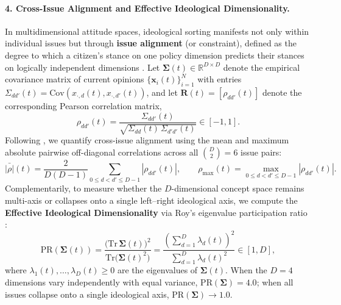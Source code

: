 \documentclass{article}
\begin{document}
\paragraph{4. Cross-Issue Alignment and Effective Ideological Dimensionality.}
In multidimensional attitude spaces, ideological sorting manifests not only within individual issues but through \textbf{issue alignment} (or constraint), defined as the degree to which a citizen's stance on one policy dimension predicts their stances on logically independent dimensions \citep{converse1964nature, baldassarri2008partisans}. Let $\boldsymbol{\Sigma}(t) \in \mathbb{R}^{D \times D}$ denote the empirical covariance matrix of current opinions $\{\mathbf{x}_i(t)\}_{i=1}^N$ with entries $\Sigma_{dd'}(t) = \mathrm{Cov}(x_{\cdot, d}(t), x_{\cdot, d'}(t))$, and let $\mathbf{R}(t) = [\rho_{dd'}(t)]$ denote the corresponding Pearson correlation matrix,
\begin{equation}
    \rho_{dd'}(t) = \frac{\Sigma_{dd'}(t)}{\sqrt{\Sigma_{dd}(t)\,\Sigma_{d'd'}(t)}} \in [-1, 1].
    \label{eq:pearson_issue_corr}
\end{equation}
Following \citet{baldassarri2008partisans}, we quantify cross-issue alignment using the mean and maximum absolute pairwise off-diagonal correlations across all $\binom{D}{2} = 6$ issue pairs:
\begin{equation}
    \bar{|\rho|}(t) = \frac{2}{D(D-1)} \sum_{0 \le d < d' \le D-1} |\rho_{dd'}(t)|, \qquad
    \rho_{\max}(t) = \max_{0 \le d < d' \le D-1} |\rho_{dd'}(t)|.
    \label{eq:issue_alignment_metrics}
\end{equation}
Complementarily, to measure whether the $D$-dimensional concept space remains multi-axis or collapses onto a single left--right ideological axis, we compute the \textbf{Effective Ideological Dimensionality} via Roy's eigenvalue participation ratio \citep{roy1953useful}:
\begin{equation}
    \mathrm{PR}(\boldsymbol{\Sigma}(t)) = \frac{\big(\mathrm{Tr}\,\boldsymbol{\Sigma}(t)\big)^2}{\mathrm{Tr}\!\big(\boldsymbol{\Sigma}(t)^2\big)} = \frac{\left(\sum_{d=1}^D \lambda_d(t)\right)^2}{\sum_{d=1}^D \lambda_d(t)^2} \in [1, D],
    \label{eq:participation_ratio}
\end{equation}
where $\lambda_1(t), \dots, \lambda_D(t) \ge 0$ are the eigenvalues of $\boldsymbol{\Sigma}(t)$. When the $D = 4$ dimensions vary independently with equal variance, $\mathrm{PR}(\boldsymbol{\Sigma}) = 4.0$; when all issues collapse onto a single ideological axis, $\mathrm{PR}(\boldsymbol{\Sigma}) \to 1.0$.
\end{document}
